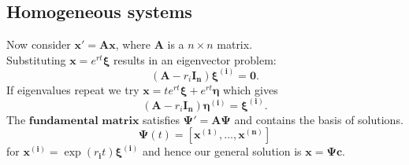 \documentclass{article}
\newcommand{\matr}[1]{\mathbf{#1}}
\begin{document}
\subsection{Homogeneous systems}
Now consider $\boldsymbol{x}'=\matr{A}\boldsymbol{x}$, where $\matr{A}$ is a $n \times n$ matrix. \\
Substituting $\boldsymbol{x}=e^{rt} \boldsymbol{\xi}$ results in an eigenvector problem:
$$(\matr{A}-r_i \matr{I_n})\boldsymbol{\xi^{(i)}}=\boldsymbol{0}.$$
If eigenvalues repeat we try $\boldsymbol{x}=te^{rt} \boldsymbol{\xi}+e^{rt} \boldsymbol{\eta}$ which gives
$$(\matr{A}-r_i \matr{I_n})\boldsymbol{\eta^{(i)}}=\boldsymbol{\xi^{(i)}}.$$
The $\textbf{fundamental matrix}$ satisfies $\boldsymbol{\Psi}'=\matr{A}\boldsymbol{\Psi}$ and contains the basis of solutions. \\
$$\boldsymbol{\Psi}(t)=[\boldsymbol{x^{(1)}}, \dots, \boldsymbol{x^{(n)}}]$$
for $\boldsymbol{x^{(i)}} = \exp{(r_{\boldsymbol{i}} t)} \boldsymbol{\xi^{(i)}}$
and hence our general solution is $\boldsymbol{x}=\boldsymbol{\Psi} \boldsymbol{c}$. \\

\newpage
    
\end{document}
